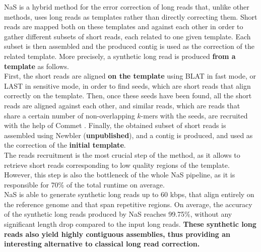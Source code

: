 \documentclass[long, final]{jobim2017}
\begin{document}
NaS is a hybrid method for the error correction of long reads that, unlike other methods, uses long reads as templates rather than directly correcting them. Short reads are mapped both on these templates and against each other in order to gather different subsets of short reads, each related to one given template. Each subset is then assembled and the produced contig is used as the correction of the related template. More precisely, a synthetic long read is produced \textbf{from a template} as follows. \\
\indent First, the short reads are aligned \textbf{on the template} using BLAT \cite{Kent2002} in fast mode, or LAST \cite{Kielbasa2011} in sensitive mode, in order to find seeds, which are short reads that align correctly on the template. Then, once these seeds have been found, all the short reads are aligned against each other, and similar reads, which are reads that share a certain number of non-overlapping $k$-mers with the seeds, are recruited with the help of Commet \cite{Maillet2014}. Finally, the obtained subset of short reads is assembled using Newbler (\textbf{unpublished}), and a contig is produced, and used as the correction of the \textbf{initial template}. \\ 
\indent The reads recruitment is the most crucial step of the method, as it allows to retrieve short reads corresponding to low quality
regions of the template. However, this step is also the bottleneck of the whole NaS pipeline, as it is responsible for 70\% of the
total runtime on average. \\
\indent NaS is able to generate synthetic long reads up to 60 kbps, that align entirely on the reference genome and that span repetitive regions. On average, the accuracy of the synthetic long reads produced by NaS reaches 99.75\%, without any significant length drop compared to the input long reads. \textbf{These synthetic long reads also yield highly contiguous assemblies, thus providing an interesting alternative to classical long read correction.}
\end{document}
